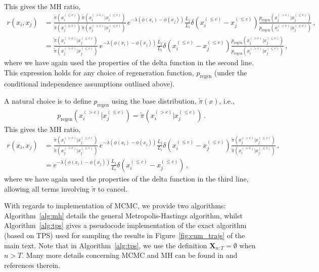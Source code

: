 \documentclass{article}
\newcommand{\unrealtraj}{\mathbf{X}}
\begin{document}
This gives the MH ratio,
\begin{align}
    r(x_{i}, x_{j}) & = \frac{\tilde{\pi}(x_{i}^{(\le c)}) \, \tilde{\pi}(x_{i}^{(> c)} | x_{i}^{(\le c)})}{\tilde{\pi}(x_{j}^{(\le c)}) \, \tilde{\pi}(x_{j}^{(> c)} | x_{j}^{(\le c)})} \, e^{-\lambda \left(\phi(x_{i}) - \phi(x_{j})\right)}\frac{L_j}{L_i} \delta(x_{i}^{(\le c)} - x_{j}^{(\le c)}) \frac{p_{\text{regen}}(x_{j}^{(> c)} | x_{j}^{(\le c)})}{p_{\text{regen}}(x_{i}^{(> c)} | x_{j}^{(\le c)})} \,, \\
                    & = \frac{\tilde{\pi}(x_{i}^{(> c)} | x_{j}^{(\le c)})}{\tilde{\pi}(x_{j}^{(> c)} | x_{j}^{(\le c)})} \, e^{-\lambda \left(\phi(x_{i}) - \phi(x_{j})\right)}\frac{L_j}{L_i} \delta(x_{i}^{(\le c)} - x_{j}^{(\le c)}) \frac{p_{\text{regen}}(x_{j}^{(> c)} | x_{j}^{(\le c)})}{p_{\text{regen}}(x_{i}^{(> c)} | x_{j}^{(\le c)})} \,,
    \label{eq:mh_ratio_tps_generic}
\end{align}
where we have again used the properties of the delta function in the second line. This expression holds for any choice of regeneration function, $p_{\text{regen}}$ (under the conditional independence assumptions outlined above).

A natural choice is to define $p_{\text{regen}}$ using the base distribution, $\tilde{\pi}(x)$, i.e.,
\begin{align}
    p_{\text{regen}}(x_{i}^{(> c)} | x_{j}^{(\le c)}) = \tilde{\pi}(x_{i}^{(> c)} | x_{j}^{(\le c)}) \,.
\end{align}
This gives the MH ratio,
\begin{align}
    r(x_{i}, x_{j}) & = \frac{\tilde{\pi}(x_{i}^{(> c)} | x_{j}^{(\le c)})}{\tilde{\pi}(x_{j}^{(> c)} | x_{j}^{(\le c)})} \, e^{-\lambda \left(\phi(x_{i}) - \phi(x_{j})\right)}\frac{L_j}{L_i} \delta(x_{i}^{(\le c)} - x_{j}^{(\le c)}) \frac{\tilde{\pi}(x_{j}^{(> c)} | x_{j}^{(\le c)})}{\tilde{\pi}(x_{i}^{(> c)} | x_{j}^{(\le c)})} \,, \\
                    & =  e^{-\lambda \left(\phi(x_{i}) - \phi(x_{j})\right)}\frac{L_j}{L_i} \delta(x_{i}^{(\le c)} - x_{j}^{(\le c)}) \,,
    \label{eq:mh_ratio_tps_final}
\end{align}
where we have again used the properties of the delta function in the third line, allowing all terms involving $\tilde{\pi}$ to cancel.

With regards to implementation of MCMC, we provide two algorithms: Algorithm~\ref{alg:mh} details the general Metropolis-Hastings algorithm, whilst Algorithm~\ref{alg:tps} gives a pseudocode implementation of the exact algorithm (based on TPS) used for sampling the results in Figure~\ref{fig:cum_trajs} of the
main text. Note that in Algorithm~\ref{alg:tps}, we use the definition $\unrealtraj_{n:T} = \emptyset$ when $n > T$. Many more details concerning MCMC and MH can be found in \cite{brooks2011handbook} and references therein.
\end{document}

